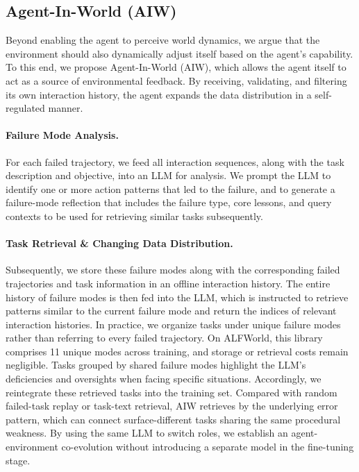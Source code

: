 \documentclass{llmxive}
\begin{document}
\subsection{Agent-In-World (AIW)}
Beyond enabling the agent to perceive world dynamics, we argue that the environment should also dynamically adjust itself based on the agent's capability. To this end, we propose Agent-In-World (AIW), which allows the agent itself to act as a source of environmental feedback. By receiving, validating, and filtering its own interaction history, the agent expands the data distribution in a self-regulated manner.

\paragraph{Failure Mode Analysis.} For each failed trajectory, we feed all interaction sequences, along with the task description and objective, into an LLM for analysis. We prompt the LLM to identify one or more action patterns that led to the failure, and to generate a failure-mode reflection that includes the failure type, core lessons, and query contexts to be used for retrieving similar tasks subsequently.

\paragraph{Task Retrieval \& Changing Data Distribution.} Subsequently, we store these failure modes along with the corresponding failed trajectories and task information in an offline interaction history. The entire history of failure modes is then fed into the LLM, which is instructed to retrieve patterns similar to the current failure mode and return the indices of relevant interaction histories. In practice, we organize tasks under unique failure modes rather than referring to every failed trajectory. On ALFWorld, this library comprises 11 unique modes across training, and storage or retrieval costs remain negligible. Tasks grouped by shared failure modes highlight the LLM's deficiencies and oversights when facing specific situations. Accordingly, we reintegrate these retrieved tasks into the training set. Compared with random failed-task replay or task-text retrieval, AIW retrieves by the underlying error pattern, which can connect surface-different tasks sharing the same procedural weakness. By using the same LLM to switch roles, we establish an agent-environment co-evolution without introducing a separate model in the fine-tuning stage.
\end{document}
